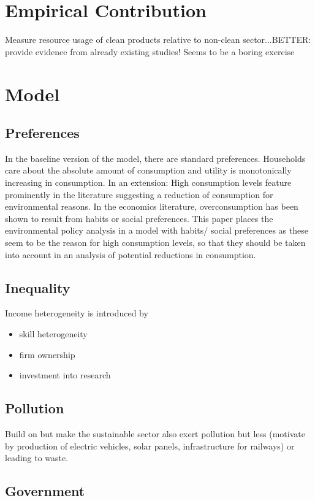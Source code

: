 \documentclass[12pt]{article}
\begin{document}
\section{Empirical Contribution}
Measure resource usage of clean products relative to non-clean sector...BETTER: provide evidence from already existing studies! Seems to be a boring exercise


\section{Model}
\subsection{Preferences}
In the baseline version of the model, there are standard preferences. Households care about the absolute amount of consumption and utility is monotonically increasing in consumption. 
In an extension: 
High consumption levels feature prominently in the literature suggesting a reduction of consumption for environmental reasons. In the economics literature, overconsumption has been shown to result from habits or social preferences. This paper places the environmental policy analysis in a model with habits/ social preferences as these seem to be the reason for high consumption levels, so that they should be taken into account in an analysis of potential reductions in consumption. 

\subsection{Inequality}

\noindent Income heterogeneity is introduced by
\begin{itemize}
\item skill heterogeneity
\item firm ownership
\item investment into research
\end{itemize}

\subsection{Pollution}
Build on \cite{Acemoglu2012TheChange} but make the sustainable sector also exert pollution but less (motivate by production of electric vehicles, solar panels, infrastructure for railways) or leading to waste.  
\subsection{Government}
\end{document}
